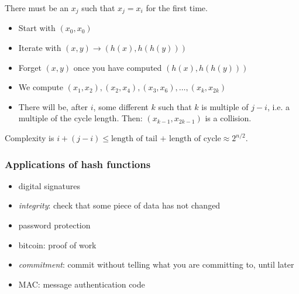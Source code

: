 \documentclass[language=english,number=]{homework}
\begin{document}
    There must be an $x_j$ such that $x_{j} = x_i$ for the first time.
    \begin{itemize}
        \item Start with $(x_0, x_0)$
        \item Iterate with $(x,y) \to (h(x), h(h(y)))$
        \item Forget $(x,y)$ once you have computed $(h(x), h(h(y)))$
        \item We compute $(x_1, x_2), (x_2, x_4), (x_3, x_6), \dots, (x_k, x_{2k})$
        \item There will be, after $i$, some different $k$ such that $k$ is multiple of $j-i$, i.e. a multiple of the cycle length.
        Then: $(x_{k-1}, x_{2k-1})$ is a collision.
    \end{itemize}

    Complexity is $i + (j-i) \le \text{length of tail + length of cycle} \approx 2^{n/2}$.

    \subsubsection{Applications of hash functions}

    \begin{itemize}
        \item digital signatures
        \item \textit{integrity}: check that some piece of data has not changed
        \item password protection
        \item bitcoin: proof of work
        \item \textit{commitment}: commit without telling what you are committing to, until later
        \item MAC: message authentication code
    \end{itemize}
\end{document}
